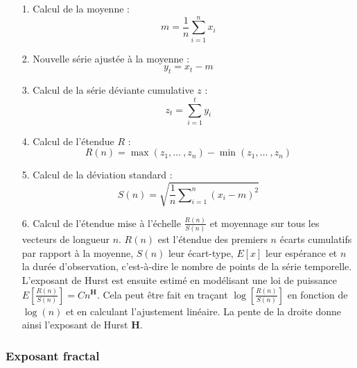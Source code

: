 \begin{itemize}
\item[1.] Calcul de la moyenne :
\begin{equation}
m = \frac{1}{n} \sum_{i=1}^n x_i
\end{equation}
\item[2.] Nouvelle série ajustée à la moyenne :
\begin{equation}
y_t = x_t - m
\end{equation}
\item[3.] Calcul de la série déviante cumulative $z$ :
\begin{equation}
z_t = \sum_{i=1}^t y_i
\end{equation}
\item[4.] Calcul de l'étendue $R$ :
\begin{equation}
R(n) = \max (z_1, \ldots~, z_n) - \min (z_1, \ldots~, z_n)
\end{equation}
\item[5.] Calcul de la déviation standard :
\begin{equation}
S(n) = \sqrt{\frac{1}{n} \sum\nolimits_{i=1}^n (x_i - m)^2}
\end{equation}
\item[6.] Calcul de l'étendue mise à l'échelle $\frac{R(n)}{S(n)}$ et moyennage sur tous les vecteurs de longueur $n$. 
$R(n)$ est l'étendue des premiers $n$ écarts cumulatifs par rapport à la moyenne, $S(n)$ leur écart-type, $E[x]$ leur espérance et $n$ la durée d'observation, c'est-à-dire le nombre de points de la série temporelle. 
L'exposant de Hurst est ensuite estimé en modélisant une loi de puissance $E[\frac{R(n)}{S(n)}]=Cn^\textbf{H}$. 
Cela peut être fait en traçant $\log[\frac{R(n)}{S(n)}]$ en fonction de $\log(n)$ et en calculant l'ajustement linéaire. 
La pente de la droite donne ainsi l'exposant de Hurst $\textbf{H}$. 
\end{itemize}

\subsubsection*{Exposant fractal}

